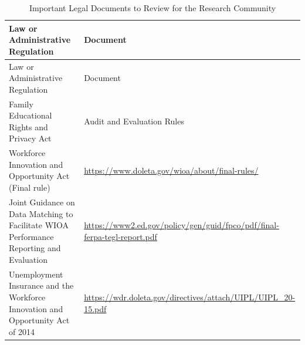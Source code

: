 \documentclass[
]{WileySix}
\begin{document}
\begin{longtable}[]{@{}ll@{}}
\caption{\label{tab:oldatable3} Important Legal Documents to Review for the Research Community}\tabularnewline
\toprule
\begin{minipage}[b]{0.47\columnwidth}\raggedright
Law or Administrative Regulation\strut
\end{minipage} & \begin{minipage}[b]{0.47\columnwidth}\raggedright
Document\strut
\end{minipage}\tabularnewline
\midrule
\endfirsthead
\toprule
\begin{minipage}[b]{0.47\columnwidth}\raggedright
Law or Administrative Regulation\strut
\end{minipage} & \begin{minipage}[b]{0.47\columnwidth}\raggedright
Document\strut
\end{minipage}\tabularnewline
\midrule
\endhead
\begin{minipage}[t]{0.47\columnwidth}\raggedright
Family Educational Rights and Privacy Act\strut
\end{minipage} & \begin{minipage}[t]{0.47\columnwidth}\raggedright
Audit and Evaluation Rules \citep{privacytechnicalassistancecenter2017}\strut
\end{minipage}\tabularnewline
\begin{minipage}[t]{0.47\columnwidth}\raggedright
Workforce Innovation and Opportunity Act (Final rule)\strut
\end{minipage} & \begin{minipage}[t]{0.47\columnwidth}\raggedright
\url{https://www.doleta.gov/wioa/about/final-rules/}\strut
\end{minipage}\tabularnewline
\begin{minipage}[t]{0.47\columnwidth}\raggedright
Joint Guidance on Data Matching to Facilitate WIOA Performance Reporting and Evaluation\strut
\end{minipage} & \begin{minipage}[t]{0.47\columnwidth}\raggedright
\url{https://www2.ed.gov/policy/gen/guid/fpco/pdf/final-ferpa-tegl-report.pdf}\strut
\end{minipage}\tabularnewline
\begin{minipage}[t]{0.47\columnwidth}\raggedright
Unemployment Insurance and the Workforce Innovation and Opportunity Act of 2014\strut
\end{minipage} & \begin{minipage}[t]{0.47\columnwidth}\raggedright
\url{https://wdr.doleta.gov/directives/attach/UIPL/UIPL_20-15.pdf}\strut
\end{minipage}\tabularnewline
\bottomrule
\end{longtable}
\end{document}
